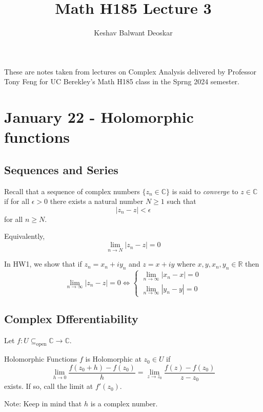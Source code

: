 \documentclass{article}
\title{Math H185 Lecture 3}
\author{Keshav Balwant Deoskar}
\newcommand{\R}{\mathbb{R}}
\newcommand{\C}{\mathbb{C}}
\begin{document}
\maketitle

These are notes taken from lectures on Complex Analysis delivered by Professor Tony Feng for UC Berekley's Math H185 class in the Sprng 2024 semester.

\tableofcontents

\pagebreak

\section{January 22 - Holomorphic functions}

\vskip 1cm
\subsection{Sequences and Series}

\vskip 0.5cm
Recall that a sequence of complex numbers $\{z_n \in \C\}$ is said to \emph{converge} to $z \in \C$ if for all $\epsilon > 0$ there exists a natural number $N \geq 1$ such that 
\[ |z_n - z| < \epsilon \] for all $n \geq N$.

Equivalently, 
\[ \lim_{n \rightarrow N} |z_n - z| = 0 \]
\begin{dottedbox}
  In HW1, we show that if $z_n = x_n + iy_n$ and $z = x + iy$ where $x, y, x_n, y_n \in \R$ then
  \[ \lim_{n \rightarrow \infty} |z_n - z| = 0 \iff \begin{cases}
    \lim_{n \rightarrow \infty} |x_n - x| = 0 \\
    \lim_{n \rightarrow \infty} |y_n - y| = 0
  \end{cases} \]
\end{dottedbox}

\vskip 1cm
\subsection{Complex Dfferentiability}
Let $f : U \subseteq_{\text{open}} \C \rightarrow \C$.

\begin{mathdefinitionbox}{Holomorphic Functions}
\vskip 0.5cm
  $f$ is Holomorphic at $z_0 \in U$ if \[ \lim_{h \rightarrow 0} \frac{f(z_0 + h) - f(z_0)}{h} = \lim_{z \rightarrow z_0} \frac{f(z) - f(z_0)}{z - z_0} \] exists. If so, call the limit at $f'(z_0)$. 

\vskip 0.5cm
Note: Keep in mind that $h$ is a complex number.
\end{mathdefinitionbox}
\end{document}
